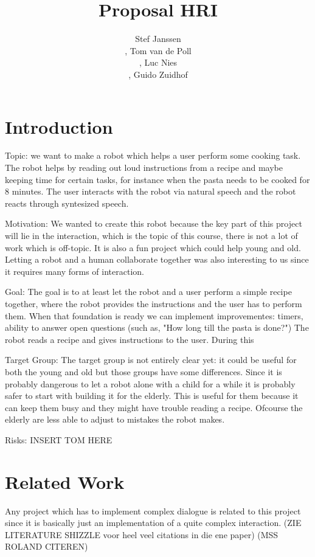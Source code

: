 \documentclass[11pt]{article} %
\title{Proposal HRI }
\author{Stef Janssen\\,
	Tom van de Poll\\,
	Luc Nies\\,
	Guido Zuidhof}
\begin{document}
\maketitle

\section{Introduction}

Topic: we want to make a robot which helps a user perform some cooking task. The robot helps by reading out loud instructions from a recipe and maybe keeping time for certain tasks, for instance when the pasta needs to be cooked for 8 minutes. The user interacts with the robot via natural speech and the robot reacts through syntesized speech.

Motivation: We wanted to create this robot because the key part of this project will lie in the interaction, which is the topic of this course, there is not a lot of work which is off-topic. It is also a fun project which could help young and old. Letting a robot and a human collaborate together was also interesting to us since it requires many forms of interaction.

Goal: The goal is to at least let the robot and a user perform a simple recipe together, where the robot provides the instructions and the user has to perform them. When that foundation is ready we can implement improvementes: timers, ability to answer open questions (such as, "How long till the pasta is done?") The robot reads a recipe and gives instructions to the user. During this 

Target Group: The target group is not entirely clear yet: it could be useful for both the young and old but those groups have some differences. Since it is probably dangerous to let a robot alone with a child for a while it is probably safer to start with building it for the elderly. This is useful for them because it can keep them busy and they might have trouble reading a recipe. Ofcourse the elderly are less able to adjust to mistakes the robot makes.

Risks: INSERT TOM HERE

\section{Related Work}
Any project which has to implement complex dialogue is related to this project since it is basically just an implementation of a quite complex interaction. (ZIE LITERATURE SHIZZLE voor heel veel citations in die ene paper) (MSS ROLAND CITEREN)
\end{document}
